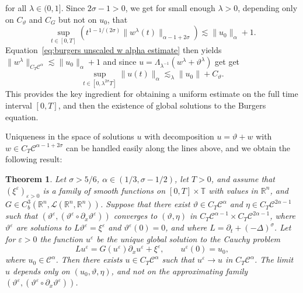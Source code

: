 \documentclass[a4paper,11pt]{article}
\newtheorem{theorem}{Theorem}[section]
\theoremstyle{remark}
\newcommand{\Lcal}{\mathcal{L}}
\newcommand{\CC}{\ensuremath{\mathscr{C}}}
\newcommand{\reso}{\,\mathord{\circ}\,}
\begin{document}
for all $\lambda \in ( 0,1 ]$. Since $2 \sigma -1>0$, we get for small enough
$\lambda >0$, depending only on $C_{\vartheta}$ and $C_{G}$ but not on
$u_{0}$, that
\[
   \sup_{t \in [ 0,T ]} ( t^{1-1/ ( 2 \sigma )} \| w^{\lambda} ( t ) \|_{\alpha -1+2 \sigma} ) \lesssim  \| u_{0} \|_{\alpha} +1.
\]
Equation~\eqref{eq:burgers unscaled w alpha estimate} then yields $\| w^{\lambda} \|_{C_T \CC^\alpha}\lesssim  \| u_{0} \|_{\alpha} +1$ and since $u= \Lambda_{\lambda^{-1}} ( w^{\lambda} + \vartheta^{\lambda} )$ get get
\[
   \sup_{t \in [ 0, \lambda^{2 \sigma} T ]} \| u ( t ) \|_{\alpha} \lesssim_{\lambda} \| u_{0} \| + C_{\vartheta}.
\]
This provides the key ingredient for obtaining a uniform estimate on the full time interval $[ 0,T ]$, and then the existence of global solutions to the Burgers equation.

Uniqueness in the space of solutions $u$ with decomposition $u= \vartheta +w$
with $w \in C_{T} \CC^{\alpha -1+2 \sigma}$ can be handled easily along the
lines above, and we obtain the following result:

\begin{theorem}\label{theorem:burgers existence uniqueness}
  Let $\sigma > 5/6$, $\alpha \in ( 1/3, \sigma -1/2 )$, let $T>0$,
  and assume that $( \xi^{\varepsilon} )_{\varepsilon >0}$ is a family of
  smooth functions on $[ 0,T ] \times \mathbb{T}$ with values in
  $\mathbb{R}^{n}$, and $G \in C^{3}_{b} ( \mathbb{R}^{n} ,\Lcal (\mathbb{R}^{n} ,\mathbb{R}^{n} ) )$. Suppose that there exist $\vartheta \in C_{T} \CC^{\alpha}$ and $\eta \in C_{T} \CC^{2 \alpha -1}$ such that $(\vartheta^{\varepsilon} , ( \vartheta^{\varepsilon} \reso   \partial_{x} \vartheta^{\varepsilon} ) )$ converges to $( \vartheta , \eta )$ in $C_{T}
  \CC^{\alpha -1} \times C_{T} \CC^{2 \alpha -1}$, where
  $\vartheta^{\varepsilon}$ are solutions to $L \vartheta^{\varepsilon} = \xi^{\varepsilon}$ and $\vartheta^{\varepsilon} ( 0 ) =0$, and where $L= \partial_{t} + ( - \Delta )^{\sigma}$. Let for $\varepsilon >0$ the function $u^{\varepsilon}$ be the unique global solution to the Cauchy problem
  \[
     L u^{\varepsilon} =G ( u^{\varepsilon} ) \partial_{x} u^{\varepsilon} + \xi^{\varepsilon} , \hspace{2em} u^{\varepsilon} ( 0 ) =u_{0} ,
  \]
  where $u_{0} \in \CC^{\alpha}$. Then there exists $u \in C_{T} \CC^{\alpha}$ such that $u^{\varepsilon} \rightarrow u$ in $C_{T} \CC^\alpha$. The limit $u$ depends only on $( u_{0} , \vartheta ,\eta )$, and not on the approximating family $( \vartheta^{\varepsilon} , (\vartheta^{\varepsilon} \reso   \partial_{x} \vartheta^{\varepsilon} ) )$.
\end{theorem}
\end{document}
